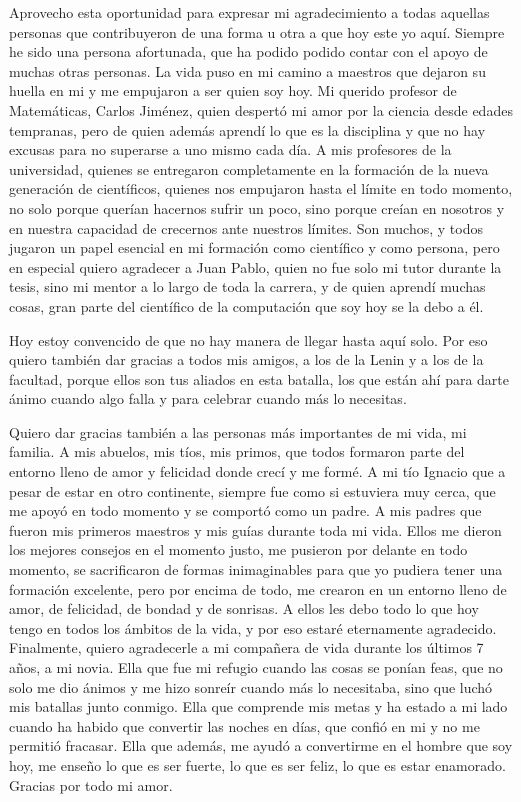 \begin{acknowledgements}

Aprovecho esta oportunidad para expresar mi agradecimiento a todas aquellas personas que contribuyeron de una forma u otra a que hoy este yo aquí.
Siempre he sido una persona afortunada, que ha podido podido contar con el apoyo de muchas otras personas.
La vida puso en mi camino a maestros que dejaron su huella en mi y me empujaron a ser quien soy hoy.
Mi querido profesor de Matemáticas, Carlos Jiménez, quien despertó mi amor por la ciencia desde edades tempranas, pero de quien además aprendí lo que es la disciplina y que no hay excusas para no superarse a uno mismo cada día.
A mis profesores de la universidad, quienes se entregaron completamente en la formación de la nueva generación de científicos, quienes nos empujaron hasta el límite en todo momento, no solo porque querían hacernos sufrir un poco, sino porque creían en nosotros y en nuestra capacidad de crecernos ante nuestros límites.
Son muchos, y todos jugaron un papel esencial en mi formación como científico y como persona, pero en especial quiero agradecer a Juan Pablo, quien no fue solo mi tutor durante la tesis, sino mi mentor a lo largo de toda la carrera, y de quien aprendí muchas cosas, gran parte del científico de la computación que soy hoy se la debo a él.

Hoy estoy convencido de que no hay manera de llegar hasta aquí solo.
Por eso quiero también dar gracias a todos mis amigos, a los de la Lenin y a los de la facultad, porque ellos son tus aliados en esta batalla, los que están ahí para darte ánimo cuando algo falla y para celebrar cuando más lo necesitas.

Quiero dar gracias también a las personas más importantes de mi vida, mi familia.
A mis abuelos, mis tíos, mis primos, que todos formaron parte del entorno lleno de amor y felicidad donde crecí y me formé.
A mi tío Ignacio que a pesar de estar en otro continente, siempre fue como si estuviera muy cerca, que me apoyó en todo momento y se comportó como un padre.
A mis padres que fueron mis primeros maestros y mis guías durante toda mi vida.
Ellos me dieron los mejores consejos en el momento justo, me pusieron por delante en todo momento, se sacrificaron de formas inimaginables para que yo pudiera tener una formación excelente, pero por encima de todo, me crearon en un entorno lleno de amor, de felicidad, de bondad y de sonrisas.
A ellos les debo todo lo que hoy tengo en todos los ámbitos de la vida, y por eso estaré eternamente agradecido.
Finalmente, quiero agradecerle a mi compañera de vida durante los últimos 7 años, a mi novia.
Ella que fue mi refugio cuando las cosas se ponían feas, que no solo me dio ánimos y me hizo sonreír cuando más lo necesitaba, sino que luchó mis batallas junto conmigo.
Ella que comprende mis metas y ha estado a mi lado cuando ha habido que convertir las noches en días, que confió en mi y no me permitió fracasar.
Ella que además, me ayudó a convertirme en el hombre que soy hoy, me enseño lo que es ser fuerte, lo que es ser feliz, lo que es estar enamorado.
Gracias por todo mi amor.


\end{acknowledgements}
